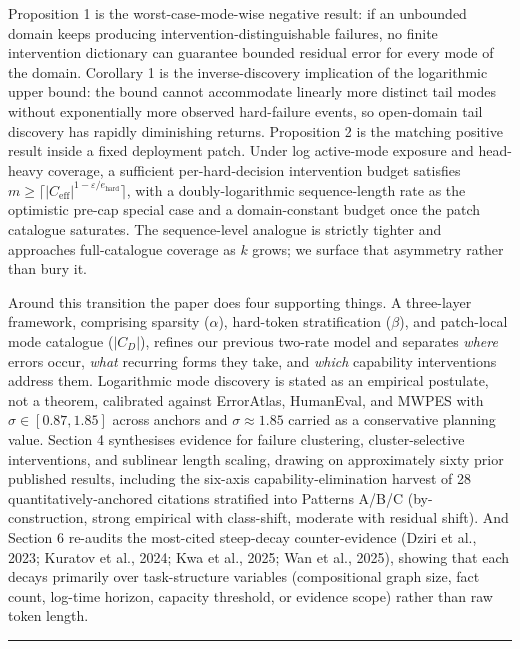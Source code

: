 \documentclass[
]{article}
\begin{document}
Proposition 1 is the worst-case-mode-wise negative result: if an
unbounded domain keeps producing intervention-distinguishable failures,
no finite intervention dictionary can guarantee bounded residual error
for every mode of the domain. Corollary 1 is the inverse-discovery
implication of the logarithmic upper bound: the bound cannot accommodate
linearly more distinct tail modes without exponentially more observed
hard-failure events, so open-domain tail discovery has rapidly
diminishing returns. Proposition 2 is the matching positive result
inside a fixed deployment patch. Under log active-mode exposure and
head-heavy coverage, a sufficient per-hard-decision intervention budget
satisfies
\(m \geq \lceil |C_{\text{eff}}|^{1 - \varepsilon / e_{\text{hard}}} \rceil\),
with a doubly-logarithmic sequence-length rate as the optimistic pre-cap
special case and a domain-constant budget once the patch catalogue
saturates. The sequence-level analogue is strictly tighter and
approaches full-catalogue coverage as \(k\) grows; we surface that
asymmetry rather than bury it.

Around this transition the paper does four supporting things. A
three-layer framework, comprising sparsity (\(\alpha\)), hard-token
stratification (\(\beta\)), and patch-local mode catalogue (\(|C_D|\)),
refines our previous two-rate model and separates \emph{where} errors
occur, \emph{what} recurring forms they take, and \emph{which}
capability interventions address them. Logarithmic mode discovery is
stated as an empirical postulate, not a theorem, calibrated against
ErrorAtlas, HumanEval, and MWPES with \(\sigma \in [0.87, 1.85]\) across
anchors and \(\sigma \approx 1.85\) carried as a conservative planning
value. Section 4 synthesises evidence for failure clustering,
cluster-selective interventions, and sublinear length scaling, drawing
on approximately sixty prior published results, including the six-axis
capability-elimination harvest of 28 quantitatively-anchored citations
stratified into Patterns A/B/C (by-construction, strong empirical with
class-shift, moderate with residual shift). And Section 6 re-audits the
most-cited steep-decay counter-evidence (Dziri et al., 2023; Kuratov et
al., 2024; Kwa et al., 2025; Wan et al., 2025), showing that each decays
primarily over task-structure variables (compositional graph size, fact
count, log-time horizon, capacity threshold, or evidence scope) rather
than raw token length.

\begin{center}\rule{0.5\linewidth}{0.5pt}\end{center}
\end{document}
